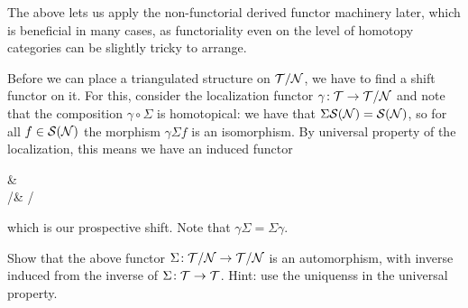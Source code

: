 The above lets us apply the non-functorial derived functor machinery later, which is beneficial in many cases, as functoriality even on the level of homotopy categories can
be slightly tricky to arrange.

Before we can place a triangulated structure on \(\mathcal{T}/\mathcal{N}\), we have to find a shift functor on it. For this, consider the localization functor \(\gamma\!:\mathcal{T}\to\mathcal{T}/\mathcal{N}\) and note that
the composition \(\gamma\circ\Sigma\) is homotopical: we have that \(\Sigma\mathcal{S}(\mathcal{N}) = \mathcal{S}(\mathcal{N})\), so for all \(f\in\mathcal{S}(\mathcal{N})\) the morphism \(\gamma\Sigma f\) is an isomorphism.
By universal property of the localization, this means we have an induced functor
\begin{diagram*}
	\calT\ar[r,"\Sigma"]\ar[d,"\gamma"'] & \calT\ar[d,"\gamma"] \\
	\calT/\calN{} & \calT/\calN
\end{diagram*}
which is our prospective shift. Note that \(\gamma\Sigma = \Sigma\gamma\).

\begin{exercise}
	Show that the above functor \(\Sigma\!:\mathcal{T}/\mathcal{N}\to\mathcal{T}/\mathcal{N}\) is an automorphism, with inverse induced from the inverse of \(\Sigma\!:\mathcal{T}\to\mathcal{T}\). Hint: use the uniquenss in the universal property.
\end{exercise}

